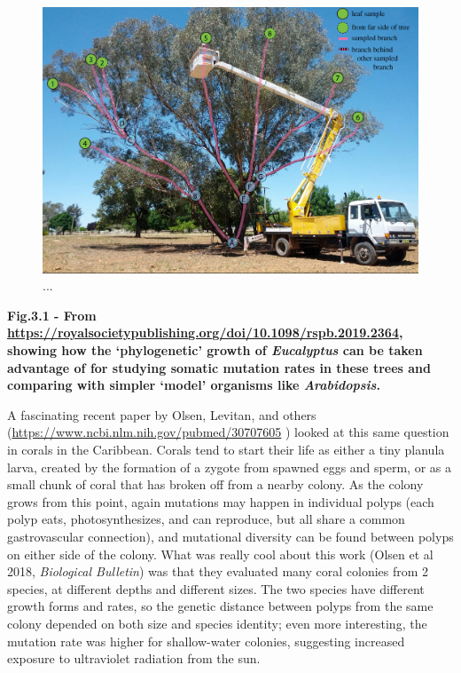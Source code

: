 \documentclass[
]{article}
\begin{document}
\begin{figure}

{\centering \includegraphics[width=0.9\linewidth]{MEImages/eucalyptus} 

}

\caption{...}\label{fig:unnamed-chunk-2}
\end{figure}

\textbf{Fig.3.1 - From
\url{https://royalsocietypublishing.org/doi/10.1098/rspb.2019.2364},
showing how the `phylogenetic' growth of \emph{Eucalyptus} can be taken
advantage of for studying somatic mutation rates in these trees and
comparing with simpler `model' organisms like \emph{Arabidopsis}.}

A fascinating recent paper by Olsen, Levitan, and others
(\url{https://www.ncbi.nlm.nih.gov/pubmed/30707605} ) looked at this
same question in corals in the Caribbean. Corals tend to start their
life as either a tiny planula larva, created by the formation of a
zygote from spawned eggs and sperm, or as a small chunk of coral that
has broken off from a nearby colony. As the colony grows from this
point, again mutations may happen in individual polyps (each polyp eats,
photosynthesizes, and can reproduce, but all share a common
gastrovascular connection), and mutational diversity can be found
between polyps on either side of the colony. What was really cool about
this work (Olsen et al 2018, \emph{Biological Bulletin}) was that they
evaluated many coral colonies from 2 species, at different depths and
different sizes. The two species have different growth forms and rates,
so the genetic distance between polyps from the same colony depended on
both size and species identity; even more interesting, the mutation rate
was higher for shallow-water colonies, suggesting increased exposure to
ultraviolet radiation from the sun.
\end{document}
